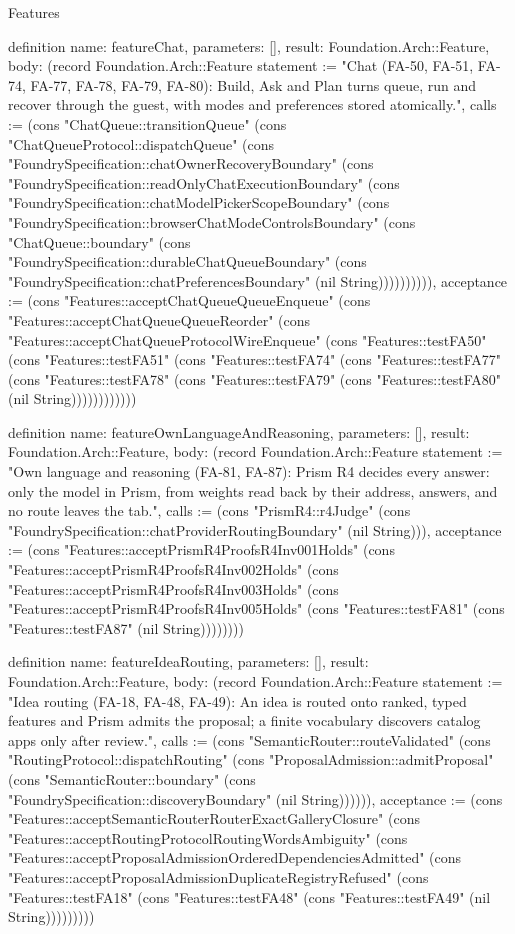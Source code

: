 \begin{lexlean}{Features}
\begin{semanticmodule}
definition{
  name: featureChat,
  parameters: [],
  result: Foundation.Arch::Feature,
  body: (record Foundation.Arch::Feature {statement := "Chat (FA-50, FA-51, FA-74, FA-77, FA-78, FA-79, FA-80): Build, Ask and Plan turns queue, run and recover through the guest, with modes and preferences stored atomically.", calls := (cons "ChatQueue::transitionQueue" (cons "ChatQueueProtocol::dispatchQueue" (cons "FoundrySpecification::chatOwnerRecoveryBoundary" (cons "FoundrySpecification::readOnlyChatExecutionBoundary" (cons "FoundrySpecification::chatModelPickerScopeBoundary" (cons "FoundrySpecification::browserChatModeControlsBoundary" (cons "ChatQueue::boundary" (cons "FoundrySpecification::durableChatQueueBoundary" (cons "FoundrySpecification::chatPreferencesBoundary" (nil String)))))))))), acceptance := (cons "Features::acceptChatQueueQueueEnqueue" (cons "Features::acceptChatQueueQueueReorder" (cons "Features::acceptChatQueueProtocolWireEnqueue" (cons "Features::testFA50" (cons "Features::testFA51" (cons "Features::testFA74" (cons "Features::testFA77" (cons "Features::testFA78" (cons "Features::testFA79" (cons "Features::testFA80" (nil String)))))))))))})
}

definition{
  name: featureOwnLanguageAndReasoning,
  parameters: [],
  result: Foundation.Arch::Feature,
  body: (record Foundation.Arch::Feature {statement := "Own language and reasoning (FA-81, FA-87): Prism R4 decides every answer: only the model in Prism, from weights read back by their address, answers, and no route leaves the tab.", calls := (cons "PrismR4::r4Judge" (cons "FoundrySpecification::chatProviderRoutingBoundary" (nil String))), acceptance := (cons "Features::acceptPrismR4ProofsR4Inv001Holds" (cons "Features::acceptPrismR4ProofsR4Inv002Holds" (cons "Features::acceptPrismR4ProofsR4Inv003Holds" (cons "Features::acceptPrismR4ProofsR4Inv005Holds" (cons "Features::testFA81" (cons "Features::testFA87" (nil String)))))))})
}

definition{
  name: featureIdeaRouting,
  parameters: [],
  result: Foundation.Arch::Feature,
  body: (record Foundation.Arch::Feature {statement := "Idea routing (FA-18, FA-48, FA-49): An idea is routed onto ranked, typed features and Prism admits the proposal; a finite vocabulary discovers catalog apps only after review.", calls := (cons "SemanticRouter::routeValidated" (cons "RoutingProtocol::dispatchRouting" (cons "ProposalAdmission::admitProposal" (cons "SemanticRouter::boundary" (cons "FoundrySpecification::discoveryBoundary" (nil String)))))), acceptance := (cons "Features::acceptSemanticRouterRouterExactGalleryClosure" (cons "Features::acceptRoutingProtocolRoutingWordsAmbiguity" (cons "Features::acceptProposalAdmissionOrderedDependenciesAdmitted" (cons "Features::acceptProposalAdmissionDuplicateRegistryRefused" (cons "Features::testFA18" (cons "Features::testFA48" (cons "Features::testFA49" (nil String))))))))})
}


\end{semanticmodule}
\end{lexlean}
